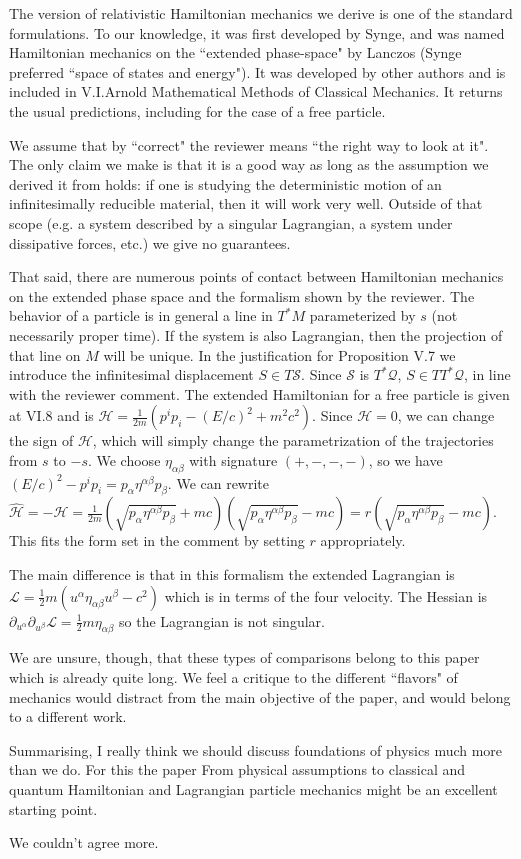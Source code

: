 \documentclass[10pt]{article}
\begin{document}
The version of relativistic Hamiltonian mechanics we derive is one of the standard formulations. To our knowledge, it was first developed by Synge, and was named Hamiltonian mechanics on the ``extended phase-space" by Lanczos (Synge preferred ``space of states and energy"). It was developed by other authors and is included in V.I.Arnold Mathematical Methods of Classical Mechanics. It returns the usual predictions, including for the case of a free particle.

We assume that by ``correct" the reviewer means ``the right way to look at it". The only claim we make is that it is a good way as long as the assumption we derived it from holds: if one is studying the deterministic motion of an infinitesimally reducible material, then it will work very well. Outside of that scope (e.g. a system described by a singular Lagrangian, a system under dissipative forces, etc.) we give no guarantees.

That said, there are numerous points of contact between Hamiltonian mechanics on the extended phase space and the formalism shown by the reviewer. The behavior of a particle is in general a line in $T^*M$ parameterized by $s$ (not necessarily proper time). If the system is also Lagrangian, then the projection of that line on $M$ will be unique. In the justification for Proposition V.7 we introduce the infinitesimal displacement $S \in T\mathcal{S}$. Since $\mathcal{S}$ is $T^*\mathcal{Q}$, $S \in TT^*\mathcal{Q}$, in line with the reviewer comment. The extended Hamiltonian for a free particle is given at VI.8 and is $\mathcal{H} = \frac{1}{2m} ( p^i p_i - (E/c)^2 + m^2c^2)$. Since $\mathcal{H}=0$, we can change the sign of $\mathcal{H}$, which will simply change the parametrization of the trajectories from $s$ to $-s$. We choose $\eta_{\alpha \beta}$ with signature $(+,-,-,-)$, so we have $(E/c)^2 - p^i p_i = p_\alpha \eta^{\alpha \beta} p_\beta$. We can rewrite $\hat{\mathcal{H}} = -\mathcal{H} = \frac{1}{2m} (\sqrt{p_\alpha \eta^{\alpha \beta} p_\beta} + mc) ( \sqrt{p_\alpha \eta^{\alpha \beta} p_\beta} - mc) = r ( \sqrt{p_\alpha \eta^{\alpha \beta} p_\beta} - mc)$. This fits the form set in the comment by setting $r$ appropriately.

The main difference is that in this formalism the extended Lagrangian is $\mathcal{L}=\frac{1}{2} m(u^\alpha \eta_{\alpha \beta} u^\beta - c^2)$ which is in terms of the four velocity. The Hessian is $\partial_{u^\alpha}\partial_{u^\beta} \mathcal{L} = \frac{1}{2}m \eta_{\alpha \beta}$ so the Lagrangian is not singular.

We are unsure, though, that these types of comparisons belong to this paper which is already quite long. We feel a critique to the different ``flavors" of mechanics would distract from the main objective of the paper, and would belong to a different work.

\begin{response}{Summarising, I really think we should discuss foundations of physics much more than
		we do. For this the paper From physical assumptions to classical and quantum Hamiltonian
		and Lagrangian particle mechanics might be an excellent starting point.}
\end{response}

We couldn't agree more.
\end{document}
